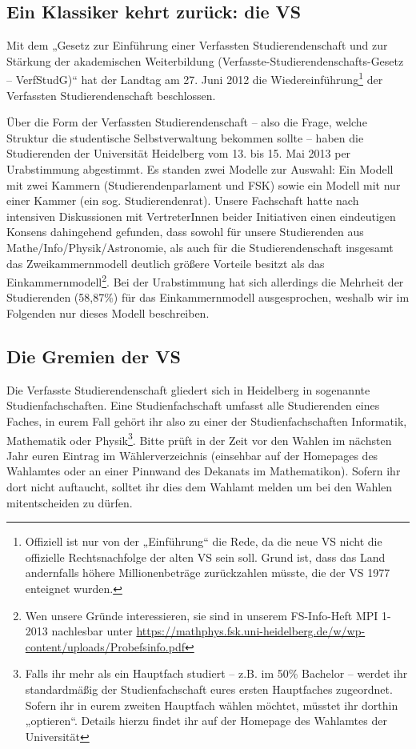 \subsection{Ein Klassiker kehrt zurück: die VS}

Mit dem „Gesetz zur Einführung einer Verfassten Studierendenschaft und zur Stärkung der akademischen Weiterbildung (Ver\-fass\-te-Stu\-dier\-en\-den\-schafts-Ge\-setz -- VerfStudG)“ hat der Landtag am 27. Juni 2012 die Wiedereinführung\footnote{Offiziell ist nur von der „Einführung“ die Rede, da die neue VS nicht die offizielle Rechtsnachfolge der alten VS sein soll. Grund ist, dass das Land andernfalls höhere Millionenbeträge zurückzahlen müsste, die der VS 1977 enteignet wurden.} der Verfassten Studierendenschaft beschlossen.

Über die Form der Verfassten Studierendenschaft -- also die Frage, welche Struktur die studentische Selbstverwaltung bekommen sollte -- haben die Studierenden der Universität Heidelberg vom 13. bis 15. Mai 2013 per Urabstimmung abgestimmt. Es standen zwei Modelle zur Auswahl: Ein Modell mit zwei Kammern (Studierendenparlament und FSK) sowie ein Modell mit nur einer Kammer (ein sog. Studierendenrat). Unsere Fachschaft hatte nach intensiven Diskussionen mit VertreterInnen beider Initiativen einen eindeutigen Konsens dahingehend gefunden, dass sowohl für unsere Studierenden aus Mathe/Info/Physik/Astronomie, als auch für die Studierendenschaft insgesamt das Zweikammernmodell deutlich größere Vorteile besitzt als das Einkammernmodell\footnote{Wen unsere Gründe interessieren, sie sind in unserem FS-Info-Heft MPI 1-2013 nachlesbar unter \url{https://mathphys.fsk.uni-heidelberg.de/w/wp-content/uploads/Probefsinfo.pdf}}. Bei der Urabstimmung hat sich allerdings die Mehrheit der Studierenden (58,87\%) für das Einkammernmodell ausgesprochen, weshalb wir im Folgenden nur dieses Modell beschreiben.

\subsection{Die Gremien der VS}

Die Verfasste Studierendenschaft gliedert sich in Heidelberg in sogenannte Studienfachschaften. Eine Studienfachschaft umfasst alle Studierenden eines Faches, in eurem Fall gehört ihr also zu einer der Studienfachschaften Informatik, Mathematik oder Physik\footnote{Falls ihr mehr als ein Hauptfach studiert -- z.B. im 50\% Bachelor -- werdet ihr standardmäßig der Studienfachschaft eures ersten Hauptfaches zugeordnet. Sofern ihr in eurem zweiten Hauptfach wählen möchtet, müsstet ihr dorthin „optieren“. Details hierzu findet ihr auf der Homepage des Wahlamtes der Universität}. Bitte prüft in der Zeit vor den Wahlen im nächsten Jahr euren Eintrag im Wählerverzeichnis (einsehbar auf der Homepages des Wahlamtes oder an einer Pinnwand des Dekanats im Mathematikon). Sofern ihr dort nicht auftaucht, solltet ihr dies dem Wahlamt melden um bei den Wahlen mitentscheiden zu dürfen.

